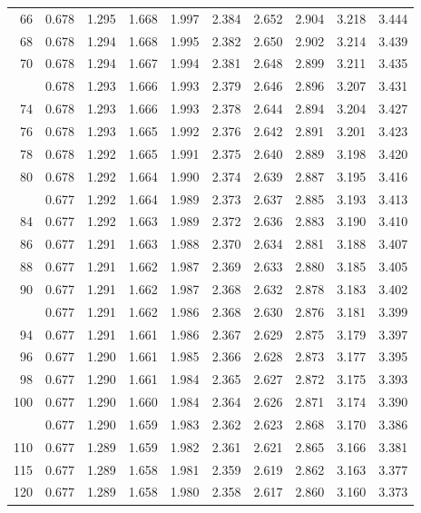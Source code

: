 \documentclass[10pt]{article}
\begin{document}
\begin{center}
\begin{longtable}{@{}r!{\vrule width 0.8pt\hspace{0.65em}}rrrrrrrrr@{}}
66 & 0.678 & 1.295 & 1.668 & 1.997 & 2.384 & 2.652 & 2.904 & 3.218 & 3.444 \\
68 & 0.678 & 1.294 & 1.668 & 1.995 & 2.382 & 2.650 & 2.902 & 3.214 & 3.439 \\
70 & 0.678 & 1.294 & 1.667 & 1.994 & 2.381 & 2.648 & 2.899 & 3.211 & 3.435 \\
 & 0.678 & 1.293 & 1.666 & 1.993 & 2.379 & 2.646 & 2.896 & 3.207 & 3.431 \\
74 & 0.678 & 1.293 & 1.666 & 1.993 & 2.378 & 2.644 & 2.894 & 3.204 & 3.427 \\
76 & 0.678 & 1.293 & 1.665 & 1.992 & 2.376 & 2.642 & 2.891 & 3.201 & 3.423 \\
78 & 0.678 & 1.292 & 1.665 & 1.991 & 2.375 & 2.640 & 2.889 & 3.198 & 3.420 \\
80 & 0.678 & 1.292 & 1.664 & 1.990 & 2.374 & 2.639 & 2.887 & 3.195 & 3.416 \\
 & 0.677 & 1.292 & 1.664 & 1.989 & 2.373 & 2.637 & 2.885 & 3.193 & 3.413 \\
84 & 0.677 & 1.292 & 1.663 & 1.989 & 2.372 & 2.636 & 2.883 & 3.190 & 3.410 \\
86 & 0.677 & 1.291 & 1.663 & 1.988 & 2.370 & 2.634 & 2.881 & 3.188 & 3.407 \\
88 & 0.677 & 1.291 & 1.662 & 1.987 & 2.369 & 2.633 & 2.880 & 3.185 & 3.405 \\
90 & 0.677 & 1.291 & 1.662 & 1.987 & 2.368 & 2.632 & 2.878 & 3.183 & 3.402 \\
 & 0.677 & 1.291 & 1.662 & 1.986 & 2.368 & 2.630 & 2.876 & 3.181 & 3.399 \\
94 & 0.677 & 1.291 & 1.661 & 1.986 & 2.367 & 2.629 & 2.875 & 3.179 & 3.397 \\
96 & 0.677 & 1.290 & 1.661 & 1.985 & 2.366 & 2.628 & 2.873 & 3.177 & 3.395 \\
98 & 0.677 & 1.290 & 1.661 & 1.984 & 2.365 & 2.627 & 2.872 & 3.175 & 3.393 \\
100 & 0.677 & 1.290 & 1.660 & 1.984 & 2.364 & 2.626 & 2.871 & 3.174 & 3.390 \\
 & 0.677 & 1.290 & 1.659 & 1.983 & 2.362 & 2.623 & 2.868 & 3.170 & 3.386 \\
110 & 0.677 & 1.289 & 1.659 & 1.982 & 2.361 & 2.621 & 2.865 & 3.166 & 3.381 \\
115 & 0.677 & 1.289 & 1.658 & 1.981 & 2.359 & 2.619 & 2.862 & 3.163 & 3.377 \\
120 & 0.677 & 1.289 & 1.658 & 1.980 & 2.358 & 2.617 & 2.860 & 3.160 & 3.373 \\

\end{longtable}
\end{center}
\end{document}
